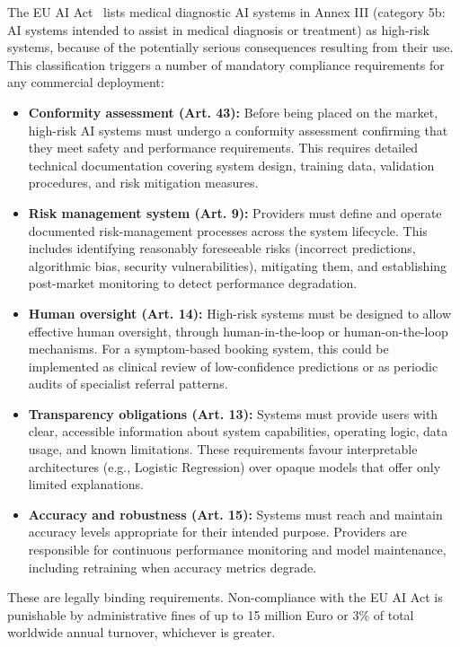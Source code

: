 The EU AI Act~\citep{EUAI2024} lists medical diagnostic AI systems in Annex III (category 5b: AI systems intended to assist in medical diagnosis or treatment) as high-risk systems, because of the potentially serious consequences resulting from their use. This classification triggers a number of mandatory compliance requirements for any commercial deployment:

\begin{itemize}
    \item \textbf{Conformity assessment (Art. 43):} Before being placed on the market, high-risk AI systems must undergo a conformity assessment confirming that they meet safety and performance requirements. This requires detailed technical documentation covering system design, training data, validation procedures, and risk mitigation measures.
    \item \textbf{Risk management system (Art. 9):} Providers must define and operate documented risk-management processes across the system lifecycle. This includes identifying reasonably foreseeable risks (incorrect predictions, algorithmic bias, security vulnerabilities), mitigating them, and establishing post-market monitoring to detect performance degradation.
    \item \textbf{Human oversight (Art. 14):} High-risk systems must be designed to allow effective human oversight, through human-in-the-loop or human-on-the-loop mechanisms. For a symptom-based booking system, this could be implemented as clinical review of low-confidence predictions or as periodic audits of specialist referral patterns.
    \item \textbf{Transparency obligations (Art. 13):} Systems must provide users with clear, accessible information about system capabilities, operating logic, data usage, and known limitations. These requirements favour interpretable architectures (e.g., Logistic Regression) over opaque models that offer only limited explanations.
    \item \textbf{Accuracy and robustness (Art. 15):} Systems must reach and maintain accuracy levels appropriate for their intended purpose. Providers are responsible for continuous performance monitoring and model maintenance, including retraining when accuracy metrics degrade.
\end{itemize}

These are legally binding requirements. Non-compliance with the EU AI Act is punishable by administrative fines of up to 15 million Euro or 3\% of total worldwide annual turnover, whichever is greater.

